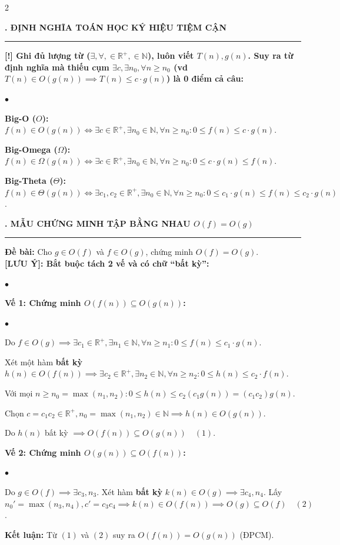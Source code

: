 \documentclass[9pt,a4paper]{article}
\def\labelitemi{$\bullet$}
\renewenvironment{itemize}{%
  \begin{list}{\labelitemi}{%
    \setlength{\topsep}{0pt}%
    \setlength{\partopsep}{0pt}%
    \setlength{\itemsep}{0pt}%
    \setlength{\parsep}{0pt}%
    \setlength{\leftmargin}{10pt}%
  }%
}{\end{list}}
\newcommand{\mysec}[1]{\vspace{2pt}\textbf{\fontsize{9.5}{10.5}\selectfont #1}\vspace{1pt}\hrule\vspace{2pt}}
\begin{document}
\begin{multicols*}{2}

\mysec{1. ĐỊNH NGHĨA TOÁN HỌC KÝ HIỆU TIỆM CẬN}
\textbf{[!] Ghi đủ lượng từ ($\exists, \forall, \in \mathbb{R}^+, \in \mathbb{N}$), luôn viết $T(n), g(n)$. Suy ra từ định nghĩa mà thiếu cụm $\exists c, \exists n_0, \forall n \ge n_0$ (vd $T(n) \in O(g(n)) \implies T(n) \le c \cdot g(n)$) là 0 điểm cả câu:}
\begin{itemize}
  \item \textbf{Big-O ($O$):} $f(n) \in O(g(n)) \iff \exists c \in \mathbb{R}^+, \exists n_0 \in \mathbb{N}, \forall n \ge n_0: 0 \le f(n) \le c \cdot g(n)$.
  \item \textbf{Big-Omega ($\Omega$):} $f(n) \in \Omega(g(n)) \iff \exists c \in \mathbb{R}^+, \exists n_0 \in \mathbb{N}, \forall n \ge n_0: 0 \le c \cdot g(n) \le f(n)$.
  \item \textbf{Big-Theta ($\Theta$):} $f(n) \in \Theta(g(n)) \iff \exists c_1, c_2 \in \mathbb{R}^+, \exists n_0 \in \mathbb{N}, \forall n \ge n_0: 0 \le c_1 \cdot g(n) \le f(n) \le c_2 \cdot g(n)$.
\end{itemize}

\mysec{2. MẪU CHỨNG MINH TẬP BẰNG NHAU $O(f) = O(g)$}
\textbf{Đề bài:} Cho $g \in O(f)$ và $f \in O(g)$, chứng minh $O(f) = O(g)$.\\
\textbf{[LƯU Ý]: Bắt buộc tách 2 vế và có chữ ``bất kỳ'':}
\begin{itemize}
  \item \textbf{Vế 1: Chứng minh $O(f(n)) \subseteq O(g(n))$:}
  \begin{itemize}
    \item Do $f \in O(g) \implies \exists c_1 \in \mathbb{R}^+, \exists n_1 \in \mathbb{N}, \forall n \ge n_1: 0 \le f(n) \le c_1 \cdot g(n)$.
    \item Xét một hàm \textbf{bất kỳ} $h(n) \in O(f(n)) \implies \exists c_2 \in \mathbb{R}^+, \exists n_2 \in \mathbb{N}, \forall n \ge n_2: 0 \le h(n) \le c_2 \cdot f(n)$.
    \item Với mọi $n \ge n_0 = \max(n_1, n_2): 0 \le h(n) \le c_2 (c_1 g(n)) = (c_1 c_2) g(n)$.
    \item Chọn $c = c_1 c_2 \in \mathbb{R}^+, n_0 = \max(n_1, n_2) \in \mathbb{N} \implies h(n) \in O(g(n))$.
    \item Do $h(n)$ bất kỳ $\implies O(f(n)) \subseteq O(g(n)) \quad (1)$.
  \end{itemize}
  \item \textbf{Vế 2: Chứng minh $O(g(n)) \subseteq O(f(n))$:}
  \begin{itemize}
    \item Do $g \in O(f) \implies \exists c_3, n_3$. Xét hàm \textbf{bất kỳ} $k(n) \in O(g) \implies \exists c_4, n_4$. Lấy $n_0' = \max(n_3, n_4), c' = c_3 c_4 \implies k(n) \in O(f(n)) \implies O(g) \subseteq O(f) \quad (2)$.
  \end{itemize}
  \item \textbf{Kết luận:} Từ $(1)$ và $(2)$ suy ra $O(f(n)) = O(g(n))$ (ĐPCM).
\end{itemize}


\end{multicols*}
\end{document}
